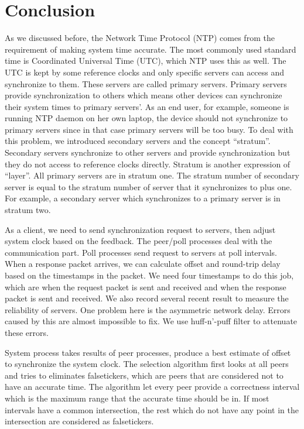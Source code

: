 
\chapter{Conclusion}
\label{cha:conclusion}

As we discussed before, the Network Time Protocol (NTP) comes from the
requirement of making system time accurate. The most commonly used standard
time is Coordinated Universal Time (UTC), which NTP uses this as well. The UTC
is kept by some reference clocks and only specific servers can access and
synchronize to them. These servers are called primary servers. Primary servers
provide synchronization to others which means other devices can synchronize
their system times to primary servers'. As an end user, for example, someone is
running NTP daemon on her own laptop, the device should not synchronize to
primary servers since in that case primary servers will be too busy. To deal
with this problem, we introduced secondary servers and the concept ``stratum''.
Secondary servers synchronize to other servers and provide synchronization but
they do not access to reference clocks directly.  Stratum is another expression
of ``layer''. All primary servers are in stratum one. The stratum number of
secondary server is equal to the stratum number of server that it synchronizes
to plus one. For example, a secondary server which synchronizes to a primary
server is in stratum two. 

As a client, we need to send synchronization request to servers, then adjust
system clock based on the feedback. The peer/poll processes deal with the
communication part. Poll processes send request to servers at poll intervals.
When a response packet arrives, we can calculate offset and round-trip delay
based on the timestamps in the packet. We need four timestamps to do this job,
which are when the request packet is sent and received and when the response
packet is sent and received. We also record several recent result to measure
the reliability of servers. One problem here is the asymmetric network delay.
Errors caused by this are almost impossible to fix. We use huff-n'-puff
filter to attenuate these errors.

System process takes results of peer processes, produce a best estimate of
offset to synchronize the system clock. The selection algorithm first looks at
all peers and tries to eliminates falsetickers, which are peers that are
considered not to have an accurate time. The algorithm let every peer provide a
correctness interval which is the maximum range that the accurate time should
be in. If most intervals have a common intersection, the rest which do not have
any point in the intersection are considered as falsetickers. 

